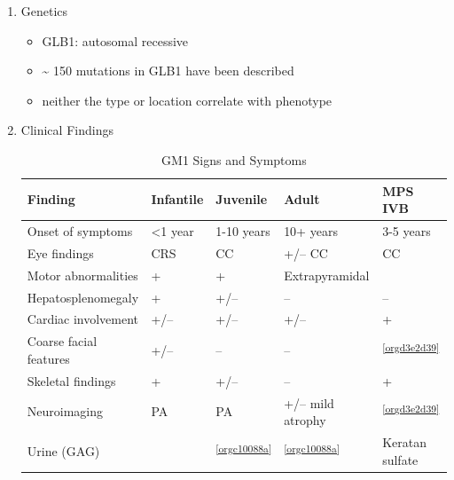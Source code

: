 \documentclass{scrartcl}
\begin{document}
\begin{enumerate}
\begin{enumerate}
\item Lysosomal multi-enzyme complex
\label{sec:org1502f68}

\begin{itemize}
\item \(\beta\)-galactosidase forms a heterotrimeric complex with:
\begin{itemize}
\item cathepsin A/PPCA : CTSA
\item neuraminidase: NEU1
\end{itemize}

\item \(\downarrow\) cathepsin A \(\to\) 2\degree  deficiency of NEU1
\begin{itemize}
\item ML-1 (sialidosis)
\end{itemize}
\end{itemize}
\end{enumerate}

\item Genetics
\label{sec:org25ff114}
\begin{itemize}
\item GLB1: autosomal recessive
\item \textasciitilde{} 150 mutations in GLB1 have been described
\item neither the type or location correlate with phenotype
\end{itemize}

\item Clinical Findings
\label{sec:org82c0df3}

\begin{table}[htbp]
\caption[GM1 Signs and Symptoms]{\label{tab:org52166ae}
GM1 Signs and Symptoms}
\centering
\begin{tabular}{lllll}
Finding & Infantile & Juvenile & Adult & MPS IVB\\
\hline
Onset of symptoms & <1 year & 1-10 years & 10+ years & 3-5 years\\
Eye findings & CRS & CC & +/– CC & CC\\
Motor abnormalities & + & + & Extrapyramidal & \footnotemark\\
Hepatosplenomegaly & + & +/– & – & –\\
Cardiac involvement & +/– & +/– & +/– & +\\
Coarse facial features & +/– & – & – & \textsuperscript{\ref{orgd3e2d39}}\\
Skeletal findings & + & +/– & – & +\\
Neuroimaging & PA & PA & +/– mild atrophy & \textsuperscript{\ref{orgd3e2d39}}\\
Urine (GAG) & \footnotemark & \textsuperscript{\ref{orgc10088a}} & \textsuperscript{\ref{orgc10088a}} & Keratan sulfate \footnotemark\\
\end{tabular}
\end{table}


\end{enumerate}
\end{document}
